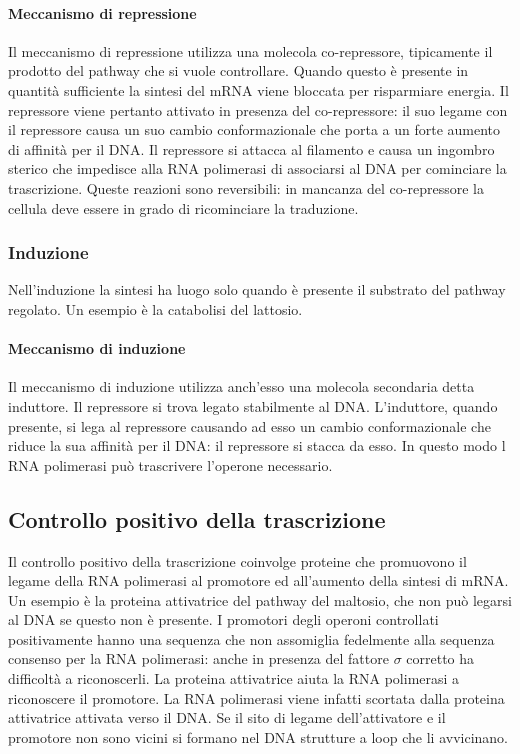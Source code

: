 			\paragraph{Meccanismo di repressione}
			Il meccanismo di repressione utilizza una molecola co-repressore, tipicamente il prodotto del pathway che si vuole controllare.
			Quando questo \`e presente in quantit\`a sufficiente la sintesi del mRNA viene bloccata per risparmiare energia.
			Il repressore viene pertanto attivato in presenza del co-repressore: il suo legame con il repressore causa un suo cambio conformazionale che porta a un forte aumento di affinit\`a per il DNA.
			Il repressore si attacca al filamento e causa un ingombro sterico che impedisce alla RNA polimerasi di associarsi al DNA per cominciare la trascrizione.
			Queste reazioni sono reversibili: in mancanza del co-repressore la cellula deve essere in grado di ricominciare la traduzione.

		\subsubsection{Induzione}
		Nell'induzione la sintesi ha luogo solo quando \`e presente il substrato del pathway regolato.
		Un esempio \`e la catabolisi del lattosio.

			\paragraph{Meccanismo di induzione}
			Il meccanismo di induzione utilizza anch'esso una molecola secondaria detta induttore.
			Il repressore si trova legato stabilmente al DNA.
			L'induttore, quando presente, si lega al repressore causando ad esso un cambio conformazionale che riduce la sua affinit\`a per il DNA: il repressore si stacca da esso.
			In questo modo l RNA polimerasi pu\`o trascrivere l'operone necessario.

	\subsection{Controllo positivo della trascrizione}
	Il controllo positivo della trascrizione coinvolge proteine che promuovono il legame della RNA polimerasi al promotore ed all'aumento della sintesi di mRNA. 
	Un esempio \`e la proteina attivatrice del pathway del maltosio, che non pu\`o legarsi al DNA se questo non \`e presente.
	I promotori degli operoni controllati positivamente hanno una sequenza che non assomiglia fedelmente alla sequenza consenso per la RNA polimerasi: anche in presenza del fattore $\sigma$ corretto ha difficoltà a riconoscerli. 
	La proteina attivatrice aiuta la RNA polimerasi a riconoscere il promotore. 
	La RNA polimerasi viene infatti scortata dalla proteina attivatrice attivata verso il DNA.
	Se il sito di legame dell'attivatore e il promotore non sono vicini si formano nel DNA strutture a loop che li avvicinano.


